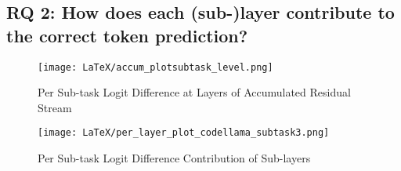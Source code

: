 
\subsection{RQ 2: How does each (sub-)layer contribute to the correct token prediction?}\label{subsec:exp2}

\begin{figure}[h] %
    \centering
    \texttt{[image: LaTeX/accum\_plotsubtask\_level.png]} %
    \caption{Per Sub-task Logit Difference at Layers of Accumulated Residual Stream} %
    \label{fig:accum_subtask} %
\end{figure}


\begin{figure}[h] %
    \centering
    \texttt{[image: LaTeX/per\_layer\_plot\_codellama\_subtask3.png]} %
    \caption{Per Sub-task Logit Difference Contribution of Sub-layers} %
    \label{fig:perlayer_subtask} %
\end{figure}



